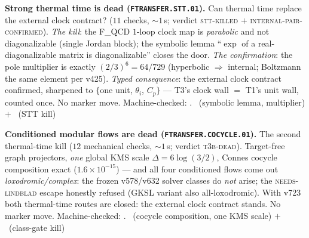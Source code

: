 \par\smallskip\noindent\textbf{Strong thermal time is dead
(\texttt{FTRANSFER.STT.01}).}
Can thermal time replace the external clock contract? ($11$ checks,
${\sim}1$\,s; verdict \textsc{stt-killed} $+$
\textsc{internal-pair-confirmed}).  \emph{The kill}: the F\_QCD
$1$-loop clock map is \emph{parabolic} and not diagonalizable
(single Jordan block); the symbolic lemma ``$\exp$ of a
real-diagonalizable matrix is diagonalizable'' closes the door.
\emph{The confirmation}: the pole multiplier is exactly
$(2/3)^6=64/729$ (hyperbolic $\Rightarrow$ internal; Boltzmann the
same element per v425).  \emph{Typed consequence}: the external
clock contract confirmed, sharpened to $\{$one unit, $\theta_i$,
$C_p\}$ --- T3's clock wall $=$ T1's unit wall, counted once.  No
marker move.
Machine-checked: .
\mE\ (symbolic lemma, multiplier) $+$ \mX\ (STT kill)
\par\smallskip

\par\smallskip\noindent\textbf{Conditioned modular flows are dead
(\texttt{FTRANSFER.COCYCLE.01}).}
The second thermal-time kill ($12$ mechanical checks, ${\sim}1$\,s;
verdict \textsc{t3b-dead}).  Target-free graph projectors, \emph{one}
global KMS scale $\Delta=6\log(3/2)$, Connes cocycle composition
exact ($1.6\times10^{-15}$) --- and all four conditioned flows come
out \emph{loxodromic/complex}: the frozen v578/v632 solver classes
do \emph{not} arise; the \textsc{needs-lindblad} escape honestly
refused (GKSL variant also all-loxodromic).  With v723 both
thermal-time routes are closed: the external clock contract stands.
No marker move.
Machine-checked: .
\mE\ (cocycle composition, one KMS scale) $+$ \mX\ (class-gate kill)
\par\smallskip
